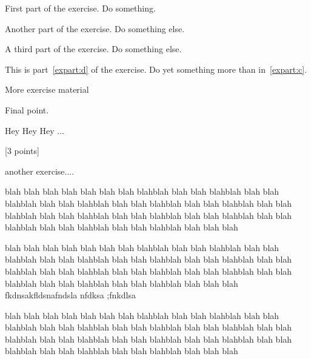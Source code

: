 \documentclass[11pt,a4paper]{article}
\begin{document}
\MakeUebungHeader

\exstarred
{}

\begin{exenumerate}
\item First part of the exercise. Do something.
\item Another part of the exercise. Do something else.
\exstarred\item \label{expart:c} A third part of the exercise. Do something else.
\item \label{expart:d} This is part~\ref{expart:d} of the exercise. Do yet something more
  than in~\ref{expart:c}.
\exstarred\item More exercise material
\item Final point.
\end{exenumerate}


Hey Hey Hey ...

\exstarred{}[3 points]

another exercise....


blah blah blah blah blah blah blah blahblah blah blah blahblah blah blah blahblah blah
blah blahblah blah blah blahblah blah blah blahblah blah blah blahblah blah blah blahblah
blah blah blahblah blah blah blahblah blah blah blahblah blah blah blahblah blah blah
blahblah blah blah blah

\exstarred{}

blah blah blah blah blah blah blah blahblah blah blah blahblah blah blah blahblah blah
blah blahblah blah blah blahblah blah blah blahblah blah blah blahblah blah blah blahblah
blah blah blahblah blah blah blahblah blah blah blahblah blah blah blahblah blah blah
blahblah blah blah blah
%
fkdnsakfldsnafndsla nfdksa ;fnkdlsa 


blah blah blah blah blah blah blah blahblah blah blah blahblah blah blah blahblah blah
blah blahblah blah blah blahblah blah blah blahblah blah blah blahblah blah blah blahblah
blah blah blahblah blah blah blahblah blah blah blahblah blah blah blahblah blah blah
blahblah blah blah blah
\end{document}
